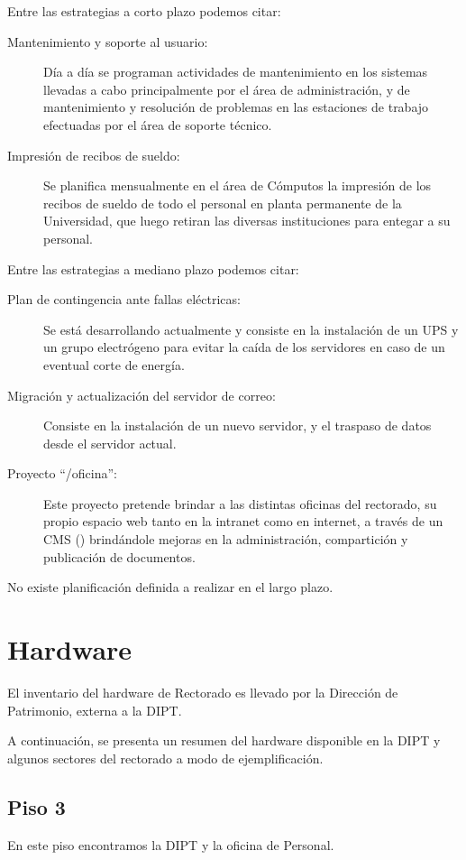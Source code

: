 \documentclass[a4paper,11pt,oneside]{article}
\begin{document}
Entre las estrategias a corto plazo podemos citar:
%
\begin{description}
\item[Mantenimiento y soporte al usuario:]
  Día a día se programan actividades de mantenimiento en los sistemas
  llevadas a cabo principalmente por el área de administración, y de
  mantenimiento y resolución de problemas en las estaciones de trabajo
  efectuadas por el área de soporte técnico.
\item[Impresión de recibos de sueldo:]
  Se planifica mensualmente en el área de Cómputos la impresión de los
  recibos de sueldo de todo el personal en planta permanente de la
  Universidad, que luego retiran las diversas instituciones para
  entegar a su personal.
\end{description}

Entre las estrategias a mediano plazo podemos citar:
%
\begin{description}
\item[Plan de contingencia ante fallas eléctricas:]
  Se está desarrollando actualmente y consiste en la instalación de un
  UPS y un grupo electrógeno para evitar la caída de los servidores en
  caso de un eventual corte de energía.
%
\item[Migración y actualización del servidor de correo:]
  Consiste en la instalación de un nuevo servidor, y el traspaso de
  datos desde el servidor actual.
%
\item[Proyecto ``/oficina'':]
  Este proyecto pretende brindar a las distintas oficinas del
  rectorado, su propio espacio web tanto en la intranet como en
  internet, a través de un CMS ()
  brindándole mejoras en la administración, compartición y publicación
  de documentos.
\end{description}
%
No existe planificación definida a realizar en el largo plazo.
%
\section{Hardware}
%
El inventario del hardware de Rectorado es llevado por la
Dirección de Patrimonio, externa a la DIPT.

A continuación, se presenta un resumen del hardware disponible en la
DIPT y algunos sectores del rectorado a modo de ejemplificación.
%
\subsection*{Piso 3}
%
En este piso encontramos la DIPT y la oficina de Personal.
%
\newpage
\end{document}
